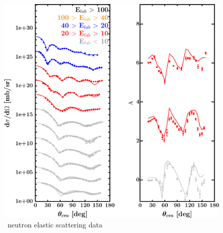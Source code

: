 \begin{figure}[H]
\begin{minipage}{0.45\textwidth}
        \includegraphics[width=1.0\textwidth]{figures/ni58_neutronElastic.png}
        \caption{\niEight\ neutron elastic scattering data}
        \label{DOMFitData_ni58_neutron_elastic}
    \end{minipage}
\end{figure}

